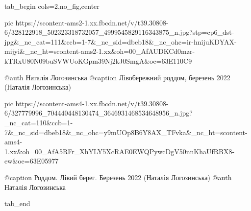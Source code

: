  
 
 
 
 




\ifcmt
  tab_begin cols=2,no_fig,center

     pic https://scontent-ams2-1.xx.fbcdn.net/v/t39.30808-6/328122918_502323318732057_4999545829116343875_n.jpg?stp=cp6_dst-jpg&_nc_cat=111&ccb=1-7&_nc_sid=dbeb18&_nc_ohc=ir-hnijuKDYAX-mijyi&_nc_ht=scontent-ams2-1.xx&oh=00_AfAUDKCd0mzr-kTRxU80N09buSVWUoKGpm39Nj2kJ0SmgA&oe=63E110C9

     @auth Наталія Логозинська
     @caption Лівобережний роддом, березень 2022 (Наталія Логозинська)

     pic https://scontent-ams4-1.xx.fbcdn.net/v/t39.30808-6/327779996_704440448130474_3646931468534648956_n.jpg?_nc_cat=110&ccb=1-7&_nc_sid=dbeb18&_nc_ohc=y9mUOp8B6Y8AX_TFvka&_nc_ht=scontent-ams4-1.xx&oh=00_AfA5RFr_XhYLY5XcRAE0EWQPywcDgV50nnKhaUfRBX8-ew&oe=63E05977

     @caption Роддом. Лівий берег. Березень 2022 (Наталія Логозинська)
     @auth Наталія Логозинська

  tab_end
\fi
